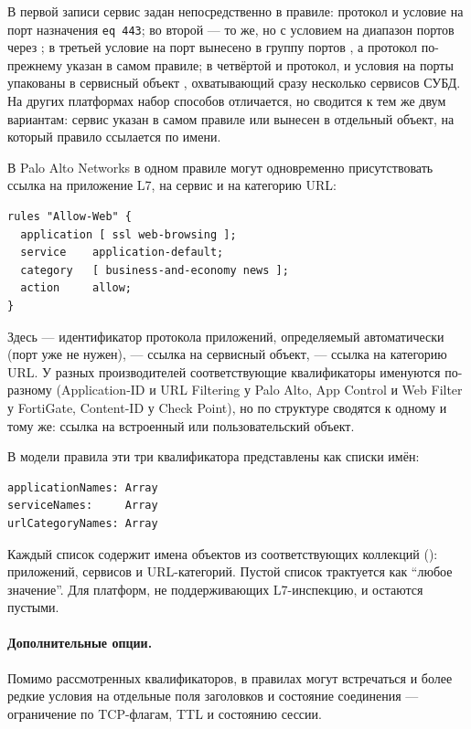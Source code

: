 В первой записи сервис задан непосредственно в правиле: протокол  и условие на порт назначения \texttt{eq 443}; во второй --- то же, но с условием на диапазон портов через ; в третьей условие на порт вынесено в группу портов , а протокол по-прежнему указан в самом правиле; в четвёртой и протокол, и условия на порты упакованы в сервисный объект , охватывающий сразу несколько сервисов СУБД. На других платформах набор способов отличается, но сводится к тем же двум вариантам: сервис указан в самом правиле или вынесен в отдельный объект, на который правило ссылается по имени.

В Palo Alto Networks в одном правиле могут одновременно присутствовать ссылка на приложение L7, на сервис и на категорию URL:

\begin{verbatim}
rules "Allow-Web" {
  application [ ssl web-browsing ];
  service    application-default;
  category   [ business-and-economy news ];
  action     allow;
}
\end{verbatim}

Здесь  --- идентификатор протокола приложений, определяемый автоматически (порт уже не нужен),  --- ссылка на сервисный объект,  --- ссылка на категорию URL. У разных производителей соответствующие квалификаторы именуются по-разному (Application-ID и URL Filtering у Palo Alto, App Control и Web Filter у FortiGate, Content-ID у Check Point), но по структуре сводятся к одному и тому же: ссылка на встроенный или пользовательский объект.

В модели правила эти три квалификатора представлены как списки имён:

\begin{lstlisting}[style=schemastyle]
applicationNames: Array
serviceNames:     Array
urlCategoryNames: Array
\end{lstlisting}

Каждый список содержит имена объектов из соответствующих коллекций (): приложений, сервисов и URL-категорий. Пустой список трактуется как ``любое значение''. Для платформ, не поддерживающих L7-инспекцию,  и  остаются пустыми.

\paragraph{Дополнительные опции.} Помимо рассмотренных квалификаторов, в правилах могут встречаться и более редкие условия на отдельные поля заголовков и состояние соединения --- ограничение по TCP-флагам, TTL и состоянию сессии.

